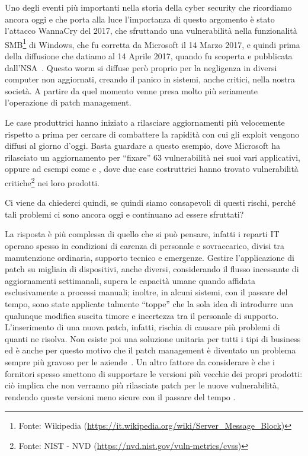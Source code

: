         Uno degli eventi più importanti nella storia della cyber security che ricordiamo ancora oggi e che porta alla luce l'importanza di questo argomento è stato l'attacco WannaCry del 2017, che sfruttando una vulnerabilità nella funzionalità SMB\footnote{Fonte: Wikipedia (\url{https://it.wikipedia.org/wiki/Server_Message_Block})} di Windows, che fu corretta da Microsoft il 14 Marzo 2017, e quindi prima della diffusione che datiamo al 14 Aprile 2017, quando fu scoperta e pubblicata dall'NSA~\cite{eternalblue_wiki}. Questo worm si diffuse però proprio per la negligenza in diversi computer non aggiornati, creando il panico in sistemi, anche critici, nella nostra società. A partire da quel momento venne presa molto più seriamente l'operazione di patch management.

        Le case produttrici hanno iniziato a rilasciare aggiornamenti più velocemente rispetto a prima per cercare di combattere la rapidità con cui gli exploit vengono diffusi al giorno d'oggi. Basta guardare a questo esempio, dove Microsoft \cite{windows_63_fixes_one_patch} ha rilasciato un aggiornamento per “fixare” 63 vulnerabilità nei suoi vari applicativi, oppure ad esempi come \cite{critical_azure_ai} e \cite{privilege_esc_cisco}, dove due case costruttrici hanno trovato vulnerabilità critiche\footnote{Fonte: NIST - NVD (\url{https://nvd.nist.gov/vuln-metrics/cvss})} nei loro prodotti. 

        Ci viene da chiederci quindi, se quindi siamo consapevoli di questi rischi, perché tali problemi ci sono ancora oggi e continuano ad essere sfruttati?
        
        La risposta è più complessa di quello che si può pensare, infatti  i reparti IT operano spesso in condizioni di carenza di personale e sovraccarico, divisi tra manutenzione ordinaria, supporto tecnico e emergenze. Gestire l'applicazione di patch su migliaia di dispositivi, anche diversi, considerando il flusso incessante di aggiornamenti settimanali, supera le capacità umane quando affidata esclusivamente a processi manuali; inoltre, in alcuni sistemi, con il passare del tempo, sono state applicate talmente “toppe” che la sola idea di introdurre una qualunque modifica suscita timore e incertezza tra il personale di supporto. L’inserimento di una nuova patch, infatti, rischia di causare più problemi di quanti ne risolva. Non esiste poi una soluzione unitaria per tutti i tipi di business ed è anche per questo motivo che il patch management è diventato un problema sempre più gravoso per le aziende~\cite{libro_patch_management}. Un altro fattore da considerare è che i fornitori spesso smettono di supportare le versioni più vecchie dei propri prodotti: ciò implica che non verranno più rilasciate patch per le nuove vulnerabilità, rendendo queste versioni meno sicure con il passare del tempo \cite{nist_patch_management}.

